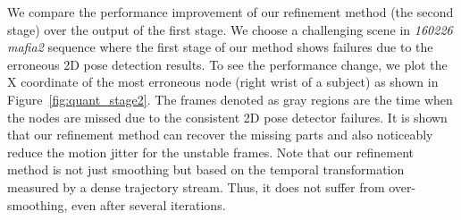 We compare the performance improvement of our refinement method (the second stage) over the output of the first stage. We choose a  challenging scene in \emph{160226 mafia2} sequence where the first stage of our method shows failures due to the erroneous 2D pose detection results. To see the performance change, we plot the X coordinate of the most erroneous node (right wrist of a subject) as shown in Figure~\ref{fig:quant_stage2}. The frames denoted as gray regions are the time when the nodes are missed due to the consistent 2D pose detector failures. It is shown that our refinement method can recover the missing parts and also noticeably reduce the motion jitter for the unstable frames. Note that our refinement method is not just smoothing but based on the temporal transformation measured by a dense trajectory stream. Thus, it does not suffer from over-smoothing, even after several iterations. %
%
%
%
%

